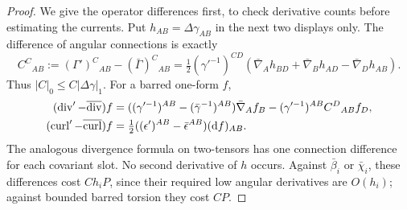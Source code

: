 \begin{proof}
We give the operator differences first, to check derivative counts
before estimating the currents.  Put $h_{AB}=\Delta\gamma_{AB}$
in the next two displays only.  The difference of angular connections
is exactly
\begin{equation}\label{dn:connection-difference}
 C^C{}_{AB}:=(\Gamma')^C{}_{AB}-(\bar\Gamma)^C{}_{AB}
 =\tfrac12(\gamma'^{-1})^{CD}
 (\bar\nabla_Ah_{BD}+\bar\nabla_Bh_{AD}-\bar\nabla_Dh_{AB}).
\end{equation}
Thus $|C|_0\le C|\Delta\gamma|_1$.  For a barred one-form $f$,
\begin{equation}\label{dn:operator-differences}
\begin{aligned}
 (\operatorname{div}'-\overline{\operatorname{div}})f
 &=((\gamma'^{-1})^{AB}-(\bar\gamma^{-1})^{AB})\bar\nabla_Af_B
            -(\gamma'^{-1})^{AB}C^D{}_{AB}f_D,\\
 (\operatorname{curl}'-\overline{\operatorname{curl}})f
 &=\tfrac12((\epsilon')^{AB}-\bar\epsilon^{AB})(\mathrm d f)_{AB}.
\end{aligned}
\end{equation}
The analogous divergence formula on two-tensors has one connection
difference for each covariant slot.  No second derivative of $h$
occurs.  Against $\bar\beta_i$ or $\bar\chi_i$, these differences
cost $Ch_iP$, since their required low angular derivatives are
$O(h_i)$; against bounded barred torsion they cost $CP$.


\end{proof}
